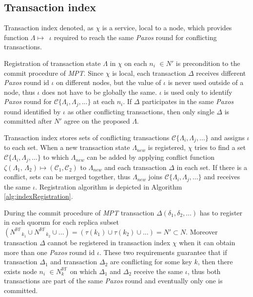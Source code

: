\documentclass[runningheads,a4paper]{llncs}
\newcommand{\nodesTx}{$\mathit{N'}$\xspace}
\newcommand{\transaction}{$\Delta$\xspace}
\newcommand{\txOne}{$\Delta_{1}$\xspace}
\newcommand{\txTwo}{$\Delta_{2}$\xspace}
\newcommand{\txStateM}{$\Lambda_{new}$\xspace}
\newcommand{\txStates}{$\{\Lambda_{i}, \Lambda_{j}, ...\}$\xspace}
\newcommand{\conflictFunction}{$\zeta (\text{\txStateOne, \txStateTwo}) \mapsto ( \mathcal{C}_1, \mathcal{C}_2)$\xspace}
\newcommand{\conflictingTxSet}{$\mathcal{C}\text{\txStates}$\xspace}
\newcommand{\NRF}{\mathit{N^{\mathbb{RF}}}}
\newcommand{\paxosRoundId}{$\iota$\xspace}
\newcommand{\transactionFull}{$\Delta(\delta_{1}, \delta_{2}, ...)$\xspace}
\newcommand{\txState}{$\Lambda$\xspace}
\newcommand{\txStateOne}{$\Lambda_1$\xspace}
\newcommand{\txStateTwo}{$\Lambda_2$\xspace}
\newcommand{\txIndex}{$\chi$\xspace}
\newcommand{\paxos}{\emph{Paxos}\xspace}
\newcommand{\mpt}{\emph{MPT}\xspace}
\newcommand{\RFaloneInMath}{\mathbb{RF}}
\newcommand{\node}[1]{$n_{#1}$\xspace}
\begin{document}
\subsection{Transaction index}

Transaction index denoted, as \txIndex is a service, local to a node, which provides function \mbox{\txState $\mapsto $ \paxosRoundId} required to reach the same \paxos round for conflicting transactions.

Registration of transaction state \txState in \txIndex on each \node{i} $\in$\nodesTx is precondition to the commit procedure of \mpt. Since \txIndex is local, each transaction \transaction receives different \paxos round id \paxosRoundId on different nodes, but the value of \paxosRoundId is never used outside of a node, thus \paxosRoundId does not have to be globally the same. \paxosRoundId is used only to identify \paxos round for \conflictingTxSet at each \node{i}. If \transaction participates in the same \paxos round identified by \paxosRoundId as other conflicting transactions, then only single \transaction is committed after \nodesTx agree on the proposed \txState.

Transaction index stores sets of conflicting transactions \conflictingTxSet and assigns \paxosRoundId to each set. When a new transaction state \txStateM is registered, \txIndex tries to find a set \conflictingTxSet to which \txStateM can be added by applying conflict function \conflictFunction to \txStateM and each transaction \transaction in each set. If there is a conflict, sets can be merged together, thus \txStateM joins \conflictingTxSet and receives the same \paxosRoundId. Registration algorithm is depicted in Algorithm \ref{alg:indexRegistration}.

During the commit procedure of \mpt transaction \transactionFull has to register in each quorum for each replica subset $(\NRF_{k_1} \cup \NRF_{k_2} \cup ... ) = (\tau(k_1) \cup \tau(k_2) \cup ... ) = \text{\nodesTx}\subset\mathit{N}$. Moreover transaction \transaction cannot be registered in transaction index \txIndex when it can obtain more than one \paxos round id \paxosRoundId. These two requirements guarantee that if transaction \txOne and transaction \txTwo are conflicting for some key $k$, then there exists node \node{i} $\in N^{\RFaloneInMath}_{k}$ on which \txOne and \txTwo receive the same \paxosRoundId, thus both transactions are part of the same \paxos round and eventually only one is committed.

\end{document}

